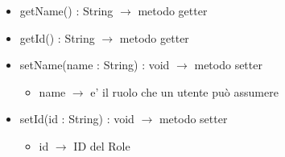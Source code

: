 \begin{description}
\begin{itemize}
	\item getName() : String $\rightarrow$ metodo getter
	\item getId() : String $\rightarrow$ metodo getter
	\item setName(name : String) : void $\rightarrow$ metodo setter\begin{itemize}
		\item name $\rightarrow$ e' il ruolo che un utente può assumere
	\end{itemize}
	
	\item setId(id : String) : void $\rightarrow$ metodo setter\begin{itemize}
		\item id $\rightarrow$ ID del Role
	\end{itemize}
	
\end{itemize}

\end{description}

